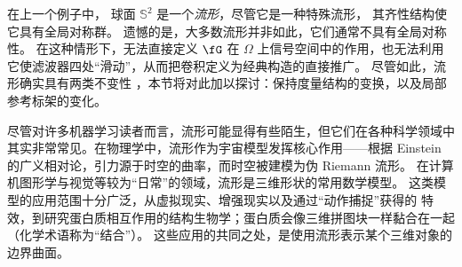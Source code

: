 



在上一个例子中，%
球面 $\mathbb{S}^2$ 
是一个{\em 流形}，尽管它是一种特殊流形，
%
其齐性结构使它具有全局对称群。
%
遗憾的是，大多数流形并非如此，它们通常不具有全局对称性。
%
在这种情形下，无法直接定义 $\fG$ 在 $\Omega$ 上信号空间中的作用，也无法利用它使滤波器四处“滑动”，从而把卷积定义为经典构造的直接推广。
%
尽管如此，流形确实具有两类不变性%
，本节将对此加以探讨：保持度量结构的变换，以及局部参考标架的变化。

尽管对许多机器学习读者而言，流形可能显得有些陌生，但它们在各种科学领域中其实非常常见。在物理学中，流形作为宇宙模型发挥核心作用——根据 Einstein 的广义相对论，引力源于时空的曲率，而时空被建模为伪 Riemann 流形。
%
在计算机图形学与视觉等较为“日常”的领域，流形是三维形状的常用数学模型。%
%
这类模型的应用范围十分广泛，从虚拟现实、增强现实以及通过“动作捕捉”获得的
特效，到研究蛋白质相互作用的结构生物学；蛋白质会像三维拼图块一样黏合在一起（化学术语称为“结合”）。
%
这些应用的共同之处，是使用流形表示某个三维对象的边界曲面。


